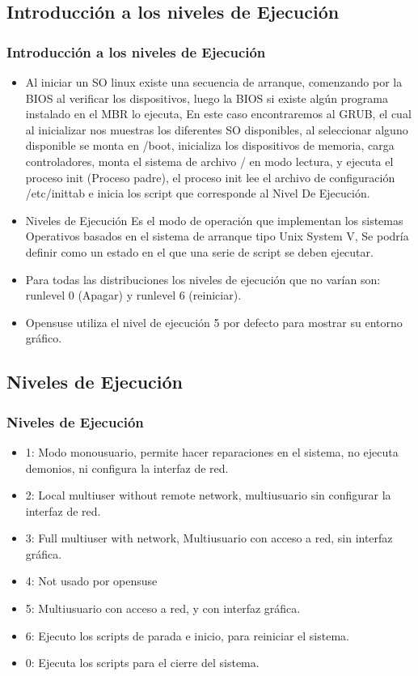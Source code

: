 \documentclass{beamer}
\begin{document}
\subsection{Introducci\'on a los niveles de Ejecuci\'on}
\begin{frame}
\frametitle{Introducci\'on a los niveles de Ejecuci\'on}
\begin{itemize}
\item Al iniciar un SO linux existe una secuencia de arranque, comenzando por la BIOS al verificar los dispositivos, luego la BIOS si existe alg\'un programa instalado en el MBR lo ejecuta, En este caso encontraremos al GRUB, el cual al inicializar nos muestras los diferentes SO disponibles, al seleccionar alguno disponible se monta en /boot, inicializa los dispositivos de memoria, carga controladores, monta el sistema de archivo / en modo lectura, y ejecuta el proceso init (Proceso padre), el proceso init lee el archivo de configuraci\'on /etc/inittab e inicia los script que corresponde al Nivel De Ejecuci\'on.
\item \alert{Niveles de Ejecuci\'on} Es el modo de operaci\'on que implementan los sistemas Operativos basados en el sistema de arranque tipo Unix System V, Se podría definir como un estado en el que una serie de script se deben ejecutar.
\item Para todas las distribuciones los niveles de ejecuci\'on que no var\'ian son: runlevel 0 (Apagar) y runlevel 6 (reiniciar).
\item Opensuse utiliza el nivel de ejecuci\'on 5 por defecto para mostrar su entorno gráfico.
\end{itemize}
\end{frame}

\subsection{Niveles de Ejecuci\'on}
\begin{frame}
\frametitle{Niveles de Ejecuci\'on}
\begin{itemize}
\item \alert{1}: Modo monousuario, permite hacer reparaciones en el sistema, no ejecuta demonios, ni configura la interfaz de red.
\item \alert{2}: Local multiuser without remote network, multiusuario sin configurar la interfaz de red. 
\item \alert{3}: Full multiuser with network, Multiusuario con acceso a red, sin interfaz gr\'afica.
\item \alert{4}: Not usado por opensuse
\item \alert{5}: Multiusuario con acceso a red, y con interfaz gr\'afica.
\item \alert{6}: Ejecuto los scripts de parada e inicio, para reiniciar el sistema.
\item \alert{0}: Ejecuta los scripts para el cierre del sistema.
\end{itemize}
\end{frame}
\end{document}
